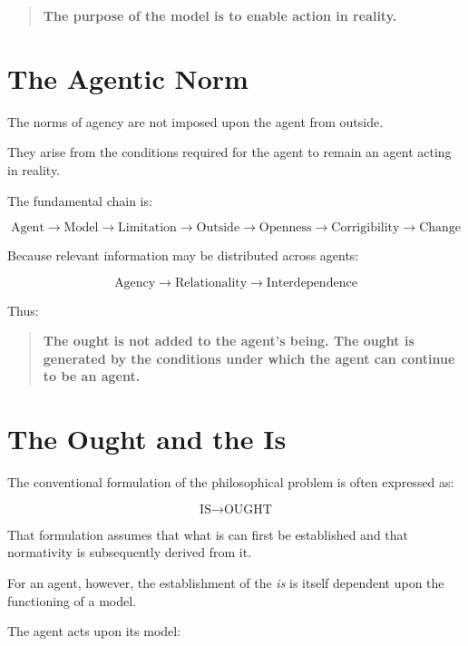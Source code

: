 \documentclass[11pt,a4paper]{article}
\begin{document}
\begin{quote}
\textbf{The purpose of the model is to enable action in reality.}
\end{quote}


\section{The Agentic Norm}

The norms of agency are not imposed upon the agent from outside.

They arise from the conditions required for the agent to remain an agent
acting in reality.

The fundamental chain is:

\[
\boxed{
\text{Agent}
\rightarrow
\text{Model}
\rightarrow
\text{Limitation}
\rightarrow
\text{Outside}
\rightarrow
\text{Openness}
\rightarrow
\text{Corrigibility}
\rightarrow
\text{Change}
}
\]

Because relevant information may be distributed across agents:

\[
\boxed{
\text{Agency}
\rightarrow
\text{Relationality}
\rightarrow
\text{Interdependence}
}
\]

Thus:

\begin{quote}
\textbf{The ought is not added to the agent's being.
The ought is generated by the conditions under which the agent can continue
to be an agent.}
\end{quote}


\section{The Ought and the Is}

The conventional formulation of the philosophical problem is often
expressed as:

\[
\text{IS} \rightarrow \text{OUGHT}
\]

That formulation assumes that what is can first be established and that
normativity is subsequently derived from it.

For an agent, however, the establishment of the \emph{is} is itself
dependent upon the functioning of a model.

The agent acts upon its model:
\end{document}
